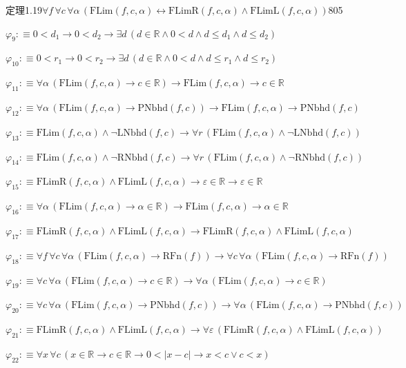 \begin{fullproof}{定理1.19}{$\forall f\,\forall c\,\forall \alpha\,(\mathrm{FLim}(f,c,\alpha) \leftrightarrow \mathrm{FLimR}(f,c,\alpha) \land \mathrm{FLimL}(f,c,\alpha))$}{805}
\begin{abbrevlist}
\item $\varphi_{9} :\equiv 0 < d_{1} \to 0 < d_{2} \to \exists d\,(d \in \mathbb{R} \land 0 < d \land d \leq d_{1} \land d \leq d_{2})$
\item $\varphi_{10} :\equiv 0 < r_{1} \to 0 < r_{2} \to \exists d\,(d \in \mathbb{R} \land 0 < d \land d \leq r_{1} \land d \leq r_{2})$
\item $\varphi_{11} :\equiv \forall \alpha\,(\mathrm{FLim}(f,c,\alpha) \to c \in \mathbb{R}) \to \mathrm{FLim}(f,c,\alpha) \to c \in \mathbb{R}$
\item $\varphi_{12} :\equiv \forall \alpha\,(\mathrm{FLim}(f,c,\alpha) \to \mathrm{PNbhd}(f,c)) \to \mathrm{FLim}(f,c,\alpha) \to \mathrm{PNbhd}(f,c)$
\item $\varphi_{13} :\equiv \mathrm{FLim}(f,c,\alpha) \land \neg \mathrm{LNbhd}(f,c) \to \forall r\,(\mathrm{FLim}(f,c,\alpha) \land \neg \mathrm{LNbhd}(f,c))$
\item $\varphi_{14} :\equiv \mathrm{FLim}(f,c,\alpha) \land \neg \mathrm{RNbhd}(f,c) \to \forall r\,(\mathrm{FLim}(f,c,\alpha) \land \neg \mathrm{RNbhd}(f,c))$
\item $\varphi_{15} :\equiv \mathrm{FLimR}(f,c,\alpha) \land \mathrm{FLimL}(f,c,\alpha) \to \varepsilon \in \mathbb{R} \to \varepsilon \in \mathbb{R}$
\item $\varphi_{16} :\equiv \forall \alpha\,(\mathrm{FLim}(f,c,\alpha) \to \alpha \in \mathbb{R}) \to \mathrm{FLim}(f,c,\alpha) \to \alpha \in \mathbb{R}$
\item $\varphi_{17} :\equiv \mathrm{FLimR}(f,c,\alpha) \land \mathrm{FLimL}(f,c,\alpha) \to \mathrm{FLimR}(f,c,\alpha) \land \mathrm{FLimL}(f,c,\alpha)$
\item $\varphi_{18} :\equiv \forall f\,\forall c\,\forall \alpha\,(\mathrm{FLim}(f,c,\alpha) \to \mathrm{RFn}(f)) \to \forall c\,\forall \alpha\,(\mathrm{FLim}(f,c,\alpha) \to \mathrm{RFn}(f))$
\item $\varphi_{19} :\equiv \forall c\,\forall \alpha\,(\mathrm{FLim}(f,c,\alpha) \to c \in \mathbb{R}) \to \forall \alpha\,(\mathrm{FLim}(f,c,\alpha) \to c \in \mathbb{R})$
\item $\varphi_{20} :\equiv \forall c\,\forall \alpha\,(\mathrm{FLim}(f,c,\alpha) \to \mathrm{PNbhd}(f,c)) \to \forall \alpha\,(\mathrm{FLim}(f,c,\alpha) \to \mathrm{PNbhd}(f,c))$
\item $\varphi_{21} :\equiv \mathrm{FLimR}(f,c,\alpha) \land \mathrm{FLimL}(f,c,\alpha) \to \forall \varepsilon\,(\mathrm{FLimR}(f,c,\alpha) \land \mathrm{FLimL}(f,c,\alpha))$
\item $\varphi_{22} :\equiv \forall x\,\forall c\,(x \in \mathbb{R} \to c \in \mathbb{R} \to 0 < \lvert x - c \rvert \to x < c \lor c < x)$

\end{abbrevlist}
\end{fullproof}
